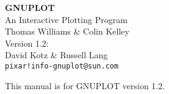 \setlength{\textwidth}{6.25in}
\setlength{\oddsidemargin}{0.5cm}
\setlength{\topmargin}{-0.5in}
\setlength{\textheight}{9in}
\setlength{\parskip}{1ex}
\setlength{\parindent}{0pt}


\pagestyle{empty}
   \rule{0in}{3in}
   \begin{center}
   {\huge\bf GNUPLOT}\\
   \vspace{3ex}
   {\Large An Interactive Plotting Program}\\
   \vspace{2ex}
   \large
   Thomas Williams \& Colin Kelley\\
   \vspace{2ex}
   Version 1.2: \\
   David Kotz \& Russell Lang\\
   \vspace{2ex}
   \verb+pixar!info-gnuplot@sun.com+

   \vfill
   {\small This manual is for GNUPLOT version 1.2.}

   \end{center}
\newpage

\tableofcontents
\newpage

\setcounter{page}{1}
\pagestyle{myheadings}

